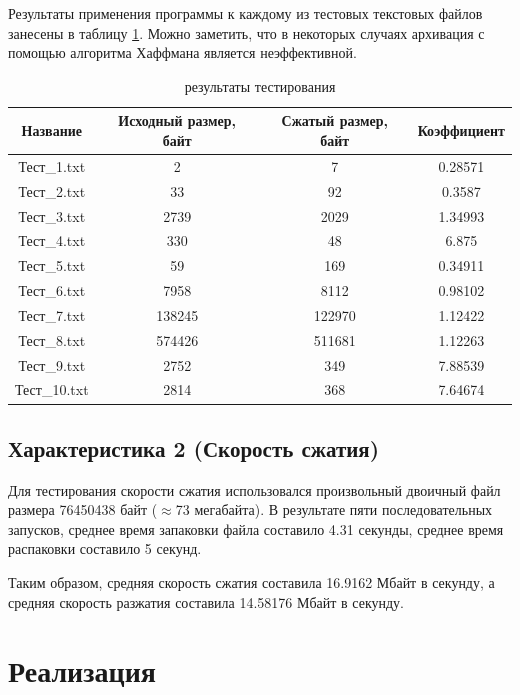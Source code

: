 \documentclass[a4paper,oneside]{article}
\theoremstyle{definition}
\begin{document}
Результаты применения программы к каждому из тестовых текстовых файлов занесены
в таблицу \ref{tbl:results}. Можно заметить, что в некоторых случаях архивация с
помощью алгоритма Хаффмана является неэффективной.

\begin{table}[H]
  \small
  \centering
  \begin{tabular}{|c|c|c|c|}
    \hline
    Название     & Исходный размер, байт & Сжатый размер, байт & Коэффициент \\ \hline \hline
    Тест\_1.txt  & 2           & 7           & 0.28571   \\ \hline
    Тест\_2.txt  & 33          & 92          & 0.3587    \\ \hline
    Тест\_3.txt  & 2739        & 2029        & 1.34993   \\ \hline
    Тест\_4.txt  & 330         & 48          & 6.875     \\ \hline
    Тест\_5.txt  & 59          & 169         & 0.34911   \\ \hline
    Тест\_6.txt  & 7958        & 8112        & 0.98102   \\ \hline
    Тест\_7.txt  & 138245      & 122970      & 1.12422   \\ \hline
    Тест\_8.txt  & 574426      & 511681      & 1.12263   \\ \hline
    Тест\_9.txt  & 2752        & 349         & 7.88539   \\ \hline
    Тест\_10.txt & 2814        & 368         & 7.64674   \\ \hline
  \end{tabular}
  \caption{результаты тестирования}
  \label{tbl:results}
\end{table}

\subsection{Характеристика 2 (Скорость сжатия)}

Для тестирования скорости сжатия использовался произвольный двоичный
файл размера 76450438 байт ($\approx$73 мегабайта). В результате пяти
последовательных запусков, среднее время запаковки файла составило 4.31
секунды, среднее время распаковки составило 5 секунд.

Таким образом, средняя скорость сжатия составила 16.9162 Мбайт в секунду, а
средняя скорость разжатия составила 14.58176 Мбайт в секунду.


\section{Реализация}
\end{document}
